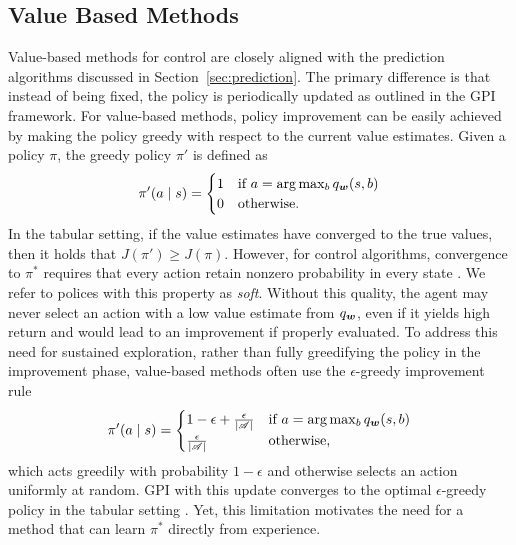   \subsection{Value Based Methods}
  Value-based methods for control are closely aligned with the prediction algorithms discussed in Section~\ref{sec:prediction}. The primary difference is that instead of being fixed, the policy is periodically updated as outlined in the GPI framework. For value-based methods, policy improvement can be easily achieved by making the policy greedy with respect to the current value estimates. Given a policy $\pi$, the greedy policy $\pi'$ is defined as
  \begin{equation}
      \pi'(a \mid s) =
      \begin{cases}
          1 & \text{if } a = \arg\max_{b} q_{\bm w}(s, b) \\
          0 & \text{otherwise.}
      \end{cases}
      \label{eq:greedy}
  \end{equation}
  In the tabular setting, if the value estimates have converged to the true values, then it holds that $J(\pi') \ge J(\pi)$. However, for control algorithms, convergence to $\pi^*$ requires that every action retain nonzero probability in every state . We refer to polices with this property as \textit{soft}. Without this quality, the agent may never select an action with a low value estimate from $q_{\bm w}$, even if it yields high return and would lead to an improvement if properly evaluated. 
  To address this need for sustained exploration, rather than fully greedifying the policy in the improvement phase, value-based methods often use the $\epsilon$-greedy improvement rule
  \begin{equation}
      \pi'(a \mid s) =
      \begin{cases}
          1 - \epsilon + \frac{\epsilon}{|\mathscr{A}|} & \text{if } a = \arg\max_{b} q_{\bm w}(s, b) \\
          \frac{\epsilon}{|\mathscr{A}|} & \text{otherwise,}
      \end{cases}
      \label{eq:epsilon_greedy}
  \end{equation}
  which acts greedily with probability $1 - \epsilon$ and otherwise selects an action uniformly at random. GPI with this update converges to the optimal $\epsilon$-greedy policy in the tabular setting . Yet, this limitation motivates the need for a method that can learn $\pi^*$ directly from experience. 
  
